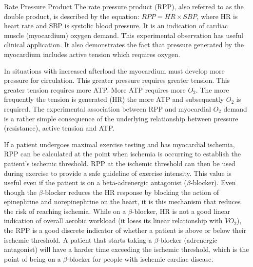 \begin{warning}{Rate Pressure Product}
    The rate pressure product (RPP), also referred to as the double product, is described by the equation: $RPP = HR \times SBP$, where HR is heart rate and SBP is systolic blood pressure. It is an indication of cardiac muscle (myocardium) oxygen demand. This experimental observation has useful clinical application. It also demonstrates the fact that pressure generated by the myocardium includes active tension which requires oxygen.
    
    In situations with increased afterload the myocardium must develop more pressure for circulation. This greater pressure requires greater tension. This greater tension requires more ATP. More ATP requires more $O_2$. The more frequently the tension is generated (HR) the more ATP and subsequently $O_2$ is required. The experimental association between RPP and myocardial $O_2$ demand is a rather simple consequence of the underlying relationship between pressure (resistance), active tension and ATP.
    
    If a patient undergoes maximal exercise testing and has myocardial ischemia, RPP can be calculated at the point when ischemia is occurring to establish the patient’s ischemic threshold. RPP at the ischemic threshold can then be used during exercise to provide a safe guideline of exercise intensity. This value is useful even if the patient is on a beta-adrenergic antagonist ($\beta$-blocker). Even though the $\beta$-blocker reduces the HR response by blocking the action of epinephrine and norepinephrine on the heart, it is this mechanism that reduces the risk of reaching ischemia. While on a $\beta$-blocker, HR is not a good linear indication of overall aerobic workload (it loses its linear relationship with $\dot{V}O_2$), the RPP is a good discrete indicator of whether a patient is above or below their ischemic threshold. A patient that starts taking a $\beta$-blocker (adrenergic antagonist) will have a harder time exceeding the ischemic threshold, which is the point of being on a $\beta$-blocker for people with ischemic cardiac disease. 
\end{warning}

